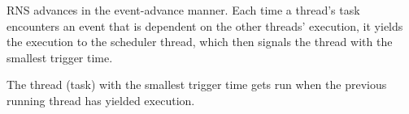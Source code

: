 RNS advances in the event-advance manner. Each time a thread's task encounters an event that is dependent on the other threads' execution, it yields the execution to the scheduler thread, which then signals the thread with the smallest trigger time.

The thread (task) with the smallest trigger time gets run when the previous running thread has yielded execution.


